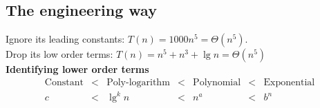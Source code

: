 \subsection{The engineering way}
Ignore its leading constants: $ T(n)=1000n^5 = \Theta(n^5) $.\\
Drop its low order terms: $ T(n)=n^5+n^3+\lg n = \Theta(n^5) $\\
\textbf{Identifying lower order terms}
\[
\begin{array}{ccccccc}
	\text{Constant} &<& \text{Poly-logarithm} &<& \text{Polynomial} &<& \text{Exponential}\\
	c &<& \lg^kn &<& n^a &<& b^n
\end{array}
\]